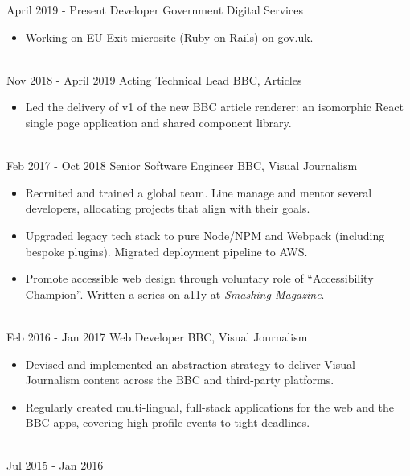 \documentclass[letterpaper]{twentysecondcv} %
\begin{document}
\begin{twenty} %
    \twentyitem
        {April 2019 -}
		{Present}
        {Developer}
        {Government Digital Services}
        {}
        {
        \begin{itemize}
        \item Working on EU Exit microsite (Ruby on Rails) on \url{gov.uk}.
        \end{itemize}
        }
    \\
    \twentyitem
        {Nov 2018 -}
		{April 2019}
        {Acting Technical Lead}
        {BBC, Articles}
        {}
        {
        \begin{itemize}
        \item Led the delivery of v1 of the new BBC article renderer: an isomorphic React single page application and shared component library.
        \end{itemize}
    	}
    \\
    \twentyitem
    	{Feb 2017 -}
		{Oct 2018}
        {Senior Software Engineer}
        {BBC, Visual Journalism}
        {}
        {
        \begin{itemize}
        \item Recruited and trained a global team. Line manage and mentor several developers, allocating projects that align with their goals.
        \item Upgraded legacy tech stack to pure Node/NPM and Webpack (including bespoke plugins). Migrated deployment pipeline to AWS.
        \item Promote accessible web design through voluntary role of ``Accessibility Champion''. Written a series on a11y at \emph{Smashing Magazine}.
        \end{itemize}
    	}
    \\
	\twentyitem
    	{Feb 2016 -}
		{Jan 2017}
        {Web Developer}
        {BBC, Visual Journalism}
        {}
        {
        {\begin{itemize}
        \item Devised and implemented an abstraction strategy to deliver Visual Journalism content across the BBC and third-party platforms.
        \item Regularly created multi-lingual, full-stack applications for the web and the BBC apps, covering high profile events to tight deadlines.
    \end{itemize}}
        }
    \\
    \twentyitem
  		{Jul 2015 -}
		{Jan 2016}

\end{twenty}
\end{document}
